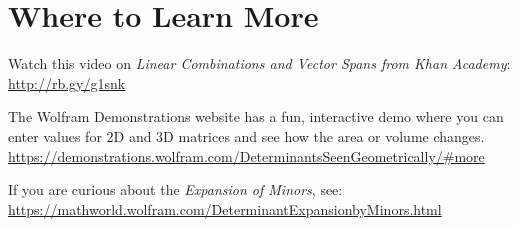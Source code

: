 \section{Where to Learn More}
Watch this video on \emph {Linear Combinations and Vector Spans from Khan Academy}: \url{http://rb.gy/g1snk}

The Wolfram Demonstrations website has a fun, interactive demo where you can enter values for 2D and 3D matrices and see how the area or volume changes. 
\url{https://demonstrations.wolfram.com/DeterminantsSeenGeometrically/#more}

If you are curious about the \emph {Expansion of Minors}, see:
\url {https://mathworld.wolfram.com/DeterminantExpansionbyMinors.html}